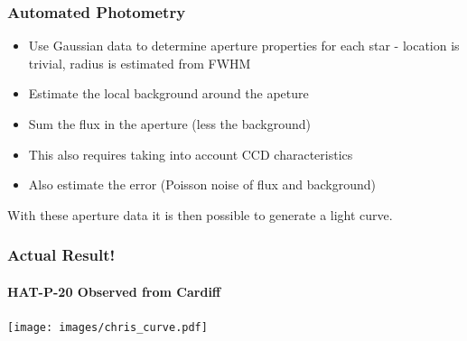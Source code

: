 \documentclass{beamer}
\begin{document}
  \begin{frame}
  \frametitle{Automated Photometry}
  \begin{itemize}
  \item Use Gaussian data to determine aperture properties for each star - location is trivial, radius is estimated from FWHM
  \item Estimate the local background around the apeture
  \item Sum the flux in the aperture (less the background)
  \item This also requires taking into account CCD characteristics
  \item Also estimate the error (Poisson noise of flux and background)
  \end{itemize}
  With these aperture data it is then possible to generate a light curve.
  \end{frame}
  \begin{frame}
  \frametitle{Actual Result!}
  \framesubtitle{HAT-P-20 Observed from Cardiff}
  \begin{center}
        \texttt{[image: images/chris\_curve.pdf]}
  \end{center}
  \end{frame}
\end{document}
